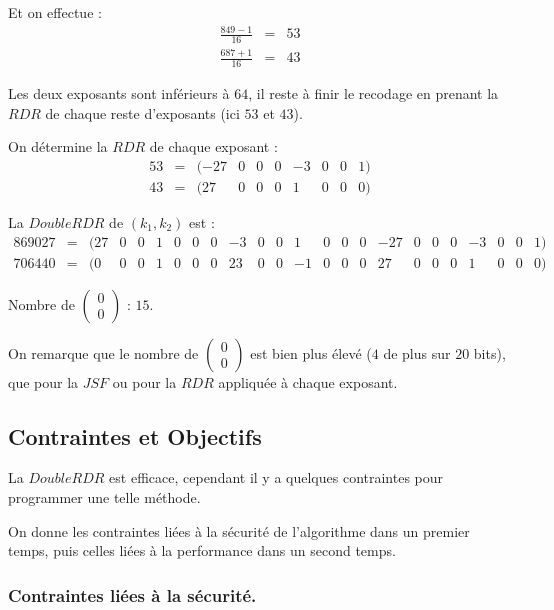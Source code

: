 \documentclass[12pt, a4paper]{memoir}
\newcommand{\doublezero}{\begin{pmatrix} 0 \\ 0 \end{pmatrix}}
\begin{document}
 Et on effectue :
 $$\begin{array}{cccccc}
  \frac{849 - 1}{16} & = & 53 \\
  \frac{687 + 1}{16} & = & 43
 \end{array}$$
 
 Les deux exposants sont inférieurs à $64$, il reste à finir le recodage en prenant la $RDR$ de chaque reste
 d'exposants (ici $53$ et $43$).
 
 On détermine la $RDR$ de chaque exposant :
   $$\begin{array}{cccccccccc}
  53 & = & (-27 & 0 & 0 & 0 & -3 & 0 & 0 & 1) \\
  43 & = & (27 & 0 & 0 & 0 & 1 & 0 & 0 & 0)
 \end{array}$$

 La $DoubleRDR$ de $(k_1,k_2)$ est :
  $$\begin{array}{cccccccccccccccccccccccc}
  869027 & = & (27 & 0 & 0 & 1 & 0 & 0 & 0 & -3 & 0 & 0 & 1 & 0 & 0 & 0 & -27 & 0 & 0 & 0 & -3 & 0 & 0 & 1) \\
  706440 & = & (0 & 0 & 0 & 1 & 0 & 0 & 0 & 23 & 0 & 0 & -1 & 0 & 0 & 0 & 27 & 0 & 0 & 0 & 1 & 0 & 0 & 0)
 \end{array}$$
 
  Nombre de $\doublezero$ : $15$.
    
  \begin{Remarque}
   On remarque que le nombre de $\doublezero$ est bien plus élevé ($4$ de plus sur $20$ bits), que pour
   la $JSF$ ou pour la $RDR$ appliquée à chaque exposant.
  \end{Remarque}
 
 \subsection{Contraintes et Objectifs}
 
 La $DoubleRDR$ est efficace, cependant il y a quelques contraintes pour programmer une telle méthode.
 
 On donne les contraintes liées à la sécurité de l'algorithme dans un premier temps, 
 puis celles liées à la performance dans un second temps. 
 
\subsubsection{Contraintes liées à la sécurité.}
\end{document}
